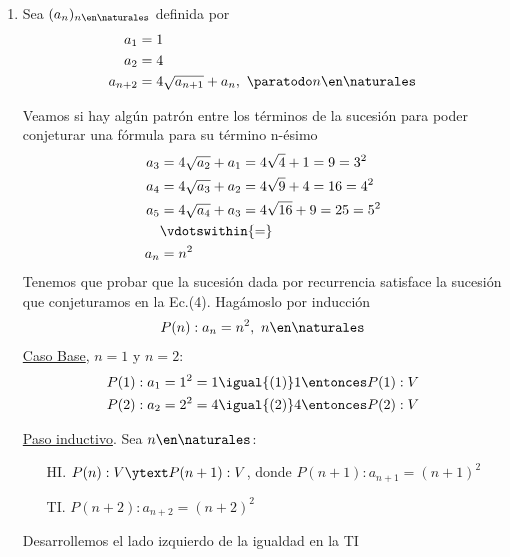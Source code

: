 \begin{enumerate}[label=\roman*)]
  \item Sea $(a_n)_{n \en \naturales }$ definida por
        \setcounter{equation}{0}
        \begin{align}
          a_1     & = 1                                                   \\
          a_2     & = 4                                                   \\
          a_{n+2} & = 4 \sqrt{a_{n+1}} + a_n,\ \paratodo n \en \naturales
        \end{align}

        Veamos si hay algún patrón entre los términos de la sucesión para poder conjeturar una fórmula para su término
        n-ésimo
        \begin{align}
          a_3 & = 4 \sqrt{a_2} + a_1 = 4 \sqrt{4} + 1 = 9 = 3^2 \nonumber   \\
          a_4 & = 4 \sqrt{a_3} + a_2 = 4 \sqrt{9} + 4 = 16 = 4^2 \nonumber  \\
          a_5 & = 4 \sqrt{a_4} + a_3 = 4 \sqrt{16} + 9 = 25 = 5^2 \nonumber \\
              & \vdotswithin{=} \nonumber                                   \\
          a_n & = n^2
        \end{align}
        Tenemos que probar que la sucesión dada por recurrencia satisface la sucesión que conjeturamos en la Ec.(4).
        Hagámoslo por inducción
        \begin{align*}
          P(n): a_n = n^2, \ n \en \naturales
        \end{align*}
        \underline{Caso Base}, $n = 1$ y $n = 2$:
        \begin{align*}
           & P(1): a_1 = 1^2 = 1 \igual{(1)} 1 \entonces P(1):V \\
           & P(2): a_2 = 2^2 = 4 \igual{(2)} 4 \entonces P(2):V \\
        \end{align*}

        \underline{Paso inductivo}. Sea $n \en \naturales $:

        \begin{enumerate}
          \item[HI.] $P(n):V  \ytext P(n+1):V$, donde $P(n+1): a_{n+1} = (n+1)^2$
          \item[TI.] $P(n+2): a_{n+2} = (n+2)^2$
        \end{enumerate}

        Desarrollemos el lado izquierdo de la igualdad en la TI


\end{enumerate}
